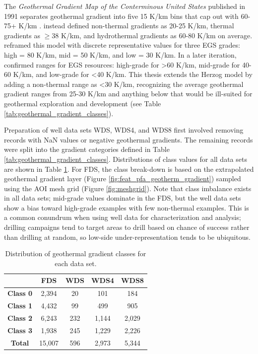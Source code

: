 The \textit{Geothermal Gradient Map of the Conterminous United States} published in 1991 separates geothermal gradient into five 15 K/km bins that cap out with 60-75+ K/km \citep{lanl_geothermal_1991}. \citet{armstead_heat_1987} instead defined non-thermal gradients as 20-25 K/km, thermal gradients as $\geq$38 K/km, and hydrothermal gradients as 60-80 K/km on average. \citet{tester_economic_1990} reframed this model with discrete representative values for three EGS grades: high = 80 K/km, mid = 50 K/km, and low = 30 K/km. In a later iteration, \citet{herzog_economic_1997} confirmed ranges for EGS resources: high-grade for >60 K/km, mid-grade for 40-60 K/km, and low-grade for <40 K/km. This thesis extends the Herzog model by adding a non-thermal range as <30 K/km, recognizing the average geothermal gradient ranges from 25-30 K/km and anything below that would be ill-suited for geothermal exploration and development (see Table \ref{tab:geothermal_gradient_classes}).

Preparation of well data sets WDS, WDS4, and WDS8 first involved removing records with NaN values or negative geothermal gradients. The remaining records were split into the gradient categories defined in Table \ref{tab:geothermal_gradient_classes}. Distributions of class values for all data sets are shown in Table \ref{tab:data_set_class_count}. For FDS, the class break-down is based on the extrapolated \citet{bielicki_hydrogeolgic_2015} geothermal gradient layer (Figure \ref{fig:feat_pfa_geotherm_gradient}) sampled using the AOI mesh grid (Figure \ref{fig:meshgrid}). Note that class imbalance exists in all data sets; mid-grade values dominate in the FDS, but the well data sets show a bias toward high-grade examples with few non-thermal examples. This is a common conundrum when using well data for characterization and analysis; drilling campaigns tend to target areas to drill based on chance of success rather than drilling at random, so low-side under-representation tends to be ubiquitous.  
\\
\begin{table}[htp]
\centering
\begin{tabular}{c|c|c|c|c|}
\cline{2-5}
 & \textbf{FDS} & \textbf{WDS} & \textbf{WDS4} & \textbf{WDS8} \\ \hline
\multicolumn{1}{|c|}{\textbf{Class 0}} & 2,394 & 20 & 101 & 184 \\ \hline
\multicolumn{1}{|c|}{\textbf{Class 1}} & 4,432 & 99 & 499 & 905 \\ \hline
\multicolumn{1}{|c|}{\textbf{Class 2}} & 6,243 & 232 & 1,144 & 2,029 \\ \hline
\multicolumn{1}{|c|}{\textbf{Class 3}} & 1,938 & 245 & 1,229 & 2,226 \\ \hline
\multicolumn{1}{|c|}{\textbf{Total}} & 15,007 & 596 & 2,973 & 5,344 \\ \hline
\end{tabular}
\caption[Data set class distribution]{Distribution of geothermal gradient classes for each data set.}
\label{tab:data_set_class_count}
\end{table}

